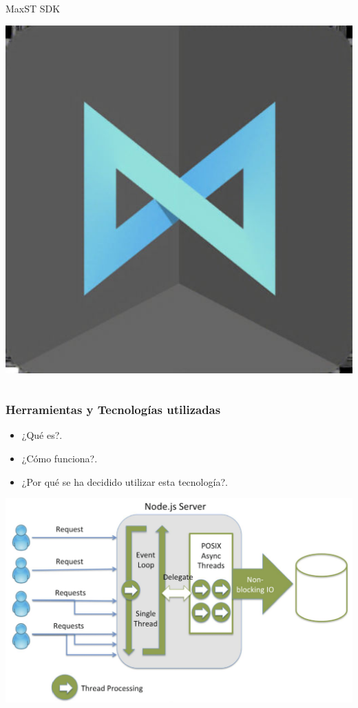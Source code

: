 \begin{frame}
\begin{columns}
			\begin{column}{0.3\textwidth}
				\begin{center}
					MaxST SDK
				\end{center}
				\vspace{3mm}
				\vfill 
					\begin{center}
						\includegraphics[width=0.5\linewidth]{Images/maxst}
					\end{center}
			\end{column}
		\end{columns}
	\endblock{}
\end{frame}

\begin{frame}
	\frametitle{Herramientas y Tecnologías utilizadas}
			\begin{itemize}
				\item {¿Qué es?}.
				\item {¿Cómo funciona?}.
				\item {¿Por qué se ha decidido utilizar esta tecnología?}.
			\end{itemize}
		\endblock{}
		\vfill 
			\begin{center}
				\includegraphics[width=0.72\linewidth]{Images/nodejsEx}
			\end{center}
\end{frame}

